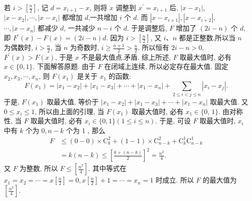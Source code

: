 若 $i>\left[\frac{n}{2}\right]$, 记 $d=x_{i+1}-x$, 则将 $x$ 调整到 $x^{\prime}=x_{i+1}$ 后, $\left|x-x_1\right|$, $\left|x-x_2\right|, \cdots,\left|x-x_i\right|$ 都增加 $d$,一共增加 $i$ 个 $d$. 而 $\left|x-x_{i+1}\right|,\left|x-x_{i+2}\right|$, $\cdots,\left|x-x_n\right|$ 都减少 $d$, 一共减少 $n-i$ 个 $d$. 于是调整后, $F$ 增加了 $(2 i-n)$ 个 $d$, 即 $F^{\prime}(x)-F(x)=(2 i-n) d$. 因为 $i>\left[\frac{n}{2}\right]$, 又 $i 、 n$ 都是正整数,所以当 $n$ 为偶数时, $i>\frac{n}{2}$, 当 $n$ 为奇数时, $i \geqslant \frac{n+1}{2}>\frac{n}{2}$. 所以恒有 $2 i-n>0$, $F^{\prime}(x)>F(x)$, 于是 $x$ 不是最大值点,矛盾.
综上所述, $F$ 取最大值时, 必有 $x \in\{0,1\}$.
下面解答原题.
由于 $F$ 在闭域上连续, 所以必定存在最大值.
固定 $x_2, x_3, \cdots, x_n$, 则 $F\left(x_1\right)$ 是关于 $x_1$ 的函数:
$$
F\left(x_1\right)=\left|x_1-x_2\right|+\left|x_1-x_3\right|+\cdots+\left|x_1-x_n\right|+\sum_{2 \leqslant i<j \leqslant n}\left|x_i-x_j\right| .
$$
于是, $F\left(x_1\right)$ 取最大值, 等价于 $\left|x_1-x_2\right|+\left|x_1-x_3\right|+\cdots+\left|x_1-x_n\right|$ 取最大值.
又 $0 \leqslant x_i \leqslant 1$, 所以由上面的引理, 当 $F\left(x_1\right)$ 取最大值时, 必有 $x_1 \in\{0$, $1\}$. 由对称性, 当 $F$ 取最大值时, 必有 $x_i \in\{0,1\}(1 \leqslant i \leqslant n)$.
于是, 可设 $F$ 取最大值时, $x_i$ 中有 $k$ 个为 $0, n-k$ 个为 1 , 那么
$$
\begin{aligned}
F & \leqslant(0-0) \times \mathrm{C}_k^2+(1-1) \times \mathrm{C}_{n-k}^2+\mathrm{C}_k^1 \mathrm{C}_{n-k}^1 \\
& =k(n-k) \leqslant\left[\frac{k+(n-k)}{2}\right]^2=\frac{n^2}{4} .
\end{aligned}
$$
又 $F$ 为整数, 所以 $F \leqslant\left[\frac{n^2}{4}\right]$.
其中等式在 $x_1=x_2=\cdots=x\left[\frac{n}{2}\right]=0, x\left[\frac{n}{2}\right]+1=\cdots=x_n=1$ 时成立.
所以 $F$ 的最大值为 $\left[\frac{n^2}{4}\right]$.



